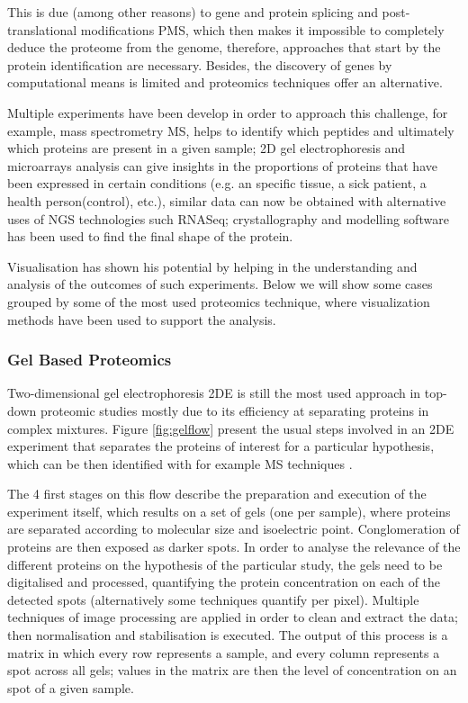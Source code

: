 This is due (among other reasons) to gene and protein splicing and post-translational modifications PMS, which then makes it impossible to completely deduce the proteome from the genome, therefore, approaches that start by the protein identification are necessary. Besides, the discovery of genes by computational means is limited and proteomics techniques offer an alternative.

Multiple experiments have been develop in order to approach this challenge, for example, mass spectrometry MS, helps to identify which peptides and ultimately which proteins are present in a given sample; 2D gel electrophoresis and microarrays analysis can give insights in the proportions of proteins that have been expressed in certain conditions (e.g. an specific tissue, a sick patient, a health person(control), etc.), similar data can now be obtained with alternative uses of NGS technologies such RNASeq; crystallography and modelling software has been used to find the final shape of the protein.

Visualisation has shown his potential by helping in the understanding and analysis of the outcomes of such experiments. Below we will show some cases grouped by some of the most used proteomics technique, where visualization methods have been used to support the analysis.

\subsubsection{Gel Based Proteomics}
Two-dimensional gel electrophoresis 2DE is still the most used approach in top-down proteomic studies mostly due to its efficiency at separating proteins in complex mixtures. Figure \ref{fig:gelflow} present the usual steps involved in an 2DE experiment that separates the proteins of interest for a particular hypothesis, which can be then identified with for example MS techniques \cite{SIL2014}.

The 4 first stages on this flow describe the preparation and execution of the experiment itself, which results on a set of gels (one per sample), where proteins are separated according to molecular size and isoelectric point. Conglomeration of proteins are then exposed as darker spots. In order to analyse the relevance of the different proteins on the hypothesis of the particular study, the gels need to be digitalised and processed, quantifying the protein concentration on each of the detected spots (alternatively some techniques quantify per pixel). Multiple techniques of image processing are applied in order to clean and extract the data; then normalisation and stabilisation is executed. The output of this process is a matrix in which every row represents a sample, and every column represents a spot across all gels; values in the matrix are then the level of concentration on an spot of a given sample. 

